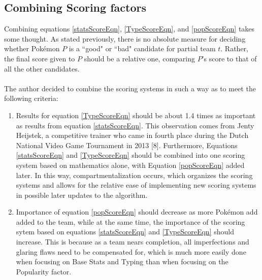 \documentclass{article}
\begin{document}
\subsection{Combining Scoring factors}
Combining equations \ref{statsScoreEqn}, \ref{TypeScoreEqn}, and \ref{popScoreEqn} takes some thought. As stated previously, there is no absolute measure for deciding whether Pok\'emon $P$ is a ``good" or ``bad" candidate for partial team $t$. Rather, the final score given to $P$ should be a relative one, comparing $P$'s score to that of all the other candidates.\\\\
The author decided to combine the scoring systems in such a way as to meet the following criteria:
\begin{enumerate}
	\item Results for equation \ref{TypeScoreEqn} should be about 1.4 times as important as results from equation \ref{statsScoreEqn}. This observation comes from Jenty Heijstek, a competitive trainer who came in fourth place during the Dutch National Video Game Tournament in 2013 [8]. Furthermore, Equations \ref{statsScoreEqn} and \ref{TypeScoreEqn} should be combined into one scoring system based on mathematics alone, with Equation \ref{popScoreEqn} added later. In this way, compartmentalization occurs, which organizes the scoring systems and allows for the relative ease of implementing new scoring systems in possible later updates to the algorithm.
	\item Importance of equation \ref{popScoreEqn} should decrease as more Pok\'emon add added to the team, while at the same time, the importance of the scoring sytem based on equations \ref{statsScoreEqn} and \ref{TypeScoreEqn} should increase. This is because as a team nears completion, all imperfections and glaring flaws need to be compensated for, which is much more easily done when focusing on Base Stats and Typing than when focusing on the Popularity factor. 
\end{enumerate}
\end{document}
